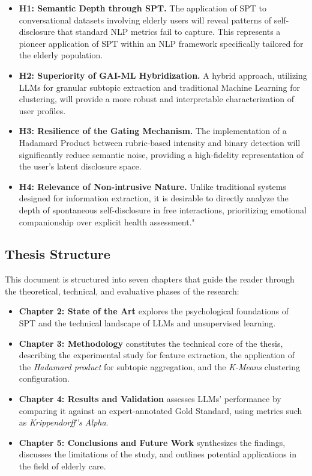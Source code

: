 \begin{itemize}
    \item \textbf{H1: Semantic Depth through SPT.} The application of SPT to conversational datasets involving elderly users will reveal patterns of self-disclosure that standard NLP metrics fail to capture. This represents a pioneer application of SPT within an NLP framework specifically tailored for the elderly population.
    
    \item \textbf{H2: Superiority of GAI-ML Hybridization.} A hybrid approach, utilizing LLMs for granular subtopic extraction and traditional Machine Learning for clustering, will provide a more robust and interpretable characterization of user profiles.
    
    \item \textbf{H3: Resilience of the Gating Mechanism.} The implementation of a Hadamard Product between rubric-based intensity and binary detection will significantly reduce semantic noise, providing a high-fidelity representation of the user's latent disclosure space.

    \item \textbf{H4: Relevance of Non-intrusive Nature.} Unlike traditional systems designed for information extraction, it is desirable to directly analyze the depth of spontaneous self-disclosure in free interactions, prioritizing emotional companionship over explicit health assessment."

    
\end{itemize}

    \subsection{Thesis Structure}


    This document is structured into seven chapters that guide the reader through the theoretical, technical, and evaluative phases of the research:

\begin{itemize}
    \item \textbf{Chapter 2: State of the Art} explores the psychological foundations of SPT and the technical landscape of LLMs and unsupervised learning.
    
    \item \textbf{Chapter 3: Methodology} constitutes the technical core of the thesis, describing the experimental study for feature extraction, the application of the \textit{Hadamard product} for \gls{subtopic} aggregation, and the \textit{K-Means} clustering configuration.
    
    \item \textbf{Chapter 4: Results and Validation} assesses LLMs' performance by comparing it against an expert-annotated \gls{Gold Standard}, using metrics such as \textit{Krippendorff’s Alpha}.
    
    \item \textbf{Chapter 5: Conclusions and Future Work} synthesizes the findings, discusses the limitations of the study, and outlines potential applications in the field of elderly care.
\end{itemize}


